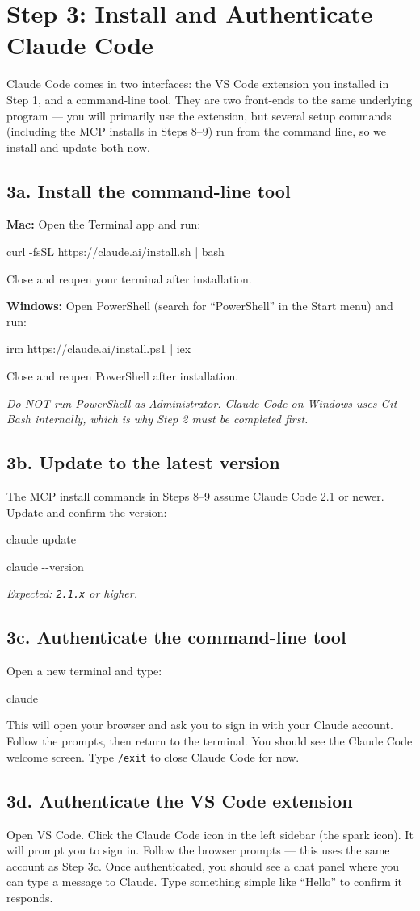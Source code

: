 \documentclass[11pt]{article}
\newcommand{\cmd}[1]{\par\vspace{0.2em}\colorbox{codegray}{\parbox{\dimexpr\linewidth-2\fboxsep}{\ttfamily\small #1}}\par\vspace{0.2em}}
\newcommand{\plat}[1]{{\color{headingblue}\textbf{#1}}}
\begin{document}
\section*{Step 3: Install and Authenticate Claude Code}
Claude Code comes in two interfaces: the VS Code extension you installed in Step 1, and a command-line tool. They are two front-ends to the same underlying program --- you will primarily use the extension, but several setup commands (including the MCP installs in Steps 8--9) run from the command line, so we install and update both now.

\subsection*{3a. Install the command-line tool}

\plat{Mac:} Open the Terminal app and run:
\cmd{curl -fsSL https://claude.ai/install.sh | bash}
Close and reopen your terminal after installation.

\plat{Windows:} Open PowerShell (search for ``PowerShell'' in the Start menu) and run:
\cmd{irm https://claude.ai/install.ps1 | iex}
Close and reopen PowerShell after installation.

\textit{Do NOT run PowerShell as Administrator. Claude Code on Windows uses Git Bash internally, which is why Step 2 must be completed first.}

\subsection*{3b. Update to the latest version}
The MCP install commands in Steps 8--9 assume Claude Code 2.1 or newer. Update and confirm the version:
\cmd{claude update}
\cmd{claude -\/-version}
\textit{Expected: \texttt{2.1.x} or higher.}

\subsection*{3c. Authenticate the command-line tool}
Open a new terminal and type:
\cmd{claude}
This will open your browser and ask you to sign in with your Claude account. Follow the prompts, then return to the terminal. You should see the Claude Code welcome screen. Type \texttt{/exit} to close Claude Code for now.

\subsection*{3d. Authenticate the VS Code extension}
Open VS Code. Click the Claude Code icon in the left sidebar (the spark icon). It will prompt you to sign in. Follow the browser prompts --- this uses the same account as Step 3c. Once authenticated, you should see a chat panel where you can type a message to Claude. Type something simple like ``Hello'' to confirm it responds.
\end{document}
